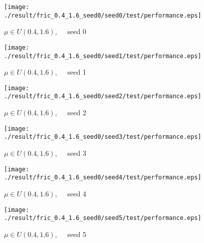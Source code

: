 \begin{figure}[p]
 \begin{minipage}{0.49\hsize}
  \begin{center}
 \texttt{[image: ./result/fric\_0.4\_1.6\_seed0/seed0/test/performance.eps]}
  \caption{$\mu\in U(0.4,1.6)$,~~~seed 0
  }
  \end{center}
 \end{minipage}
 \begin{minipage}{0.49\hsize}
   \begin{center}
 \texttt{[image: ./result/fric\_0.4\_1.6\_seed0/seed1/test/performance.eps]}
  \caption{$\mu\in U(0.4,1.6)$,~~~seed 1
  }
  \end{center}
 \end{minipage}
\end{figure}

\begin{figure}[p]
 \begin{minipage}{0.49\hsize}
  \begin{center}
 \texttt{[image: ./result/fric\_0.4\_1.6\_seed0/seed2/test/performance.eps]}
  \caption{$\mu\in U(0.4,1.6)$,~~~seed 2
  }
  \end{center}
 \end{minipage}
 \begin{minipage}{0.49\hsize}
   \begin{center}
 \texttt{[image: ./result/fric\_0.4\_1.6\_seed0/seed3/test/performance.eps]}
  \caption{$\mu\in U(0.4,1.6)$,~~~seed 3
  }
  \end{center}
 \end{minipage}
\end{figure}

\begin{figure}[p]
 \begin{minipage}{0.49\hsize}
  \begin{center}
 \texttt{[image: ./result/fric\_0.4\_1.6\_seed0/seed4/test/performance.eps]}
  \caption{$\mu\in U(0.4,1.6)$,~~~seed 4
  }
  \end{center}
 \end{minipage}
 \begin{minipage}{0.49\hsize}
   \begin{center}
 \texttt{[image: ./result/fric\_0.4\_1.6\_seed0/seed5/test/performance.eps]}
  \caption{$\mu\in U(0.4,1.6)$,~~~seed 5
  }
  \end{center}
 \end{minipage}
\end{figure}
